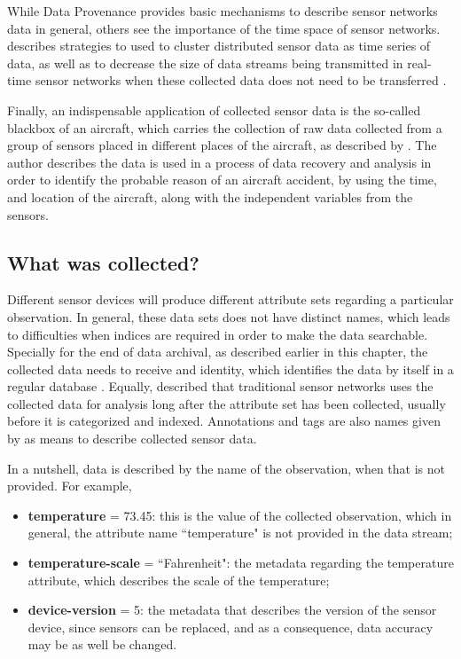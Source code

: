 While Data Provenance provides basic mechanisms to describe sensor networks
data in general, others see the importance of the time space of sensor
networks. \cite{sn-time-series} describes strategies to used to cluster
distributed sensor data as time series of data, as well as to decrease the
size of data streams being transmitted in real-time sensor networks when these
collected data does not need to be transferred \cite{sn-data-reduction}.

Finally, an indispensable application of collected sensor data is the so-called
blackbox of an aircraft, which carries the collection of raw data collected
from a group of sensors placed in different places of the aircraft, as
described by \cite{sn-exemple-blackbox}. The author describes the data is used
in a process of data recovery and analysis in order to identify the probable
reason of an aircraft accident, by using the time, and location of the
aircraft, along with the independent variables from the sensors.

\subsection{What was collected?}

Different sensor devices will produce different attribute sets regarding a
particular observation. In general, these data sets does not have distinct
names, which leads to difficulties when indices are required in order to make
the data searchable. Specially for the end of data archival, as described
earlier in this chapter, the collected data needs to receive and identity,
which identifies the data by itself in a regular database
\cite{relational-model}. Equally, \cite{sn-provenance} described that
traditional sensor networks uses the collected data for analysis long after
the attribute set has been collected, usually before it is categorized and
indexed. Annotations and tags are also names given by \cite{sn-provenance} as
means to describe collected sensor data.

In a nutshell, data is described by the name of the observation, when that is
not provided. For example,

\begin{itemize}
  \item \textbf{temperature} = 73.45: this is the value of the collected
  observation, which in general, the attribute name ``temperature" is not
  provided in the data stream;
  \item \textbf{temperature-scale} = ``Fahrenheit": the metadata regarding the
  temperature attribute, which describes the scale of the temperature;
  \item \textbf{device-version} = 5: the metadata that describes the version of
  the sensor device, since sensors can be replaced, and as a consequence, data
  accuracy may be as well be changed.
\end{itemize} 


